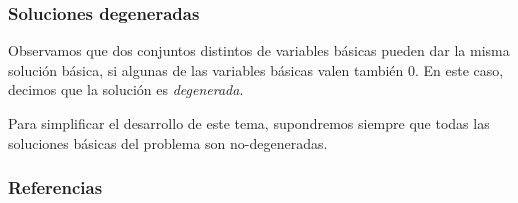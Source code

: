 \documentclass[aspectratio=169,12pt,spanish]{beamer}
\begin{document}

\begin{frame}
\frametitle{Soluciones degeneradas}

Observamos que dos conjuntos distintos de variables básicas pueden dar la misma solución básica, si algunas de las variables básicas valen también $0$. En este caso, decimos que la solución es \emph{degenerada}.

Para simplificar el desarrollo de este tema, supondremos siempre que todas las soluciones básicas del problema son no-degeneradas.


\end{frame}


\begin{frame}
\frametitle{Referencias}




\end{frame}
\end{document}
